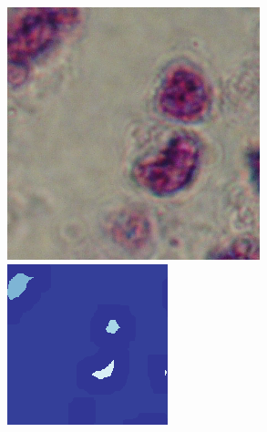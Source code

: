 \begin{figure}[b!]
	\includegraphics[width=0.97\linewidth]{Figures/Chapter2/6a3.png}	
	\includegraphics[width=0.97\linewidth]{Figures/Chapter2/6b3.png}	

\end{figure}
